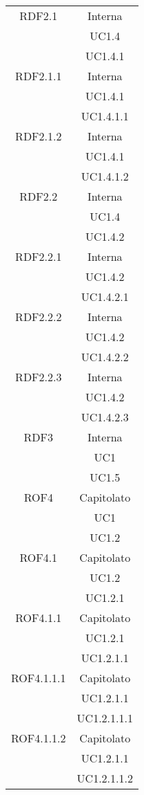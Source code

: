 \begin{longtable}{|c|c|}
\midrule
RDF2.1
& Interna\\
& UC1.4\\
& UC1.4.1\\

\midrule
RDF2.1.1
& Interna\\
& UC1.4.1\\
& UC1.4.1.1\\

\midrule
RDF2.1.2
& Interna\\
& UC1.4.1\\
& UC1.4.1.2\\

\midrule
RDF2.2
& Interna\\
& UC1.4\\
& UC1.4.2\\

\midrule
RDF2.2.1
& Interna\\
& UC1.4.2\\
& UC1.4.2.1\\

\midrule
RDF2.2.2
& Interna\\
& UC1.4.2\\
& UC1.4.2.2\\

\midrule
RDF2.2.3
& Interna\\
& UC1.4.2\\
& UC1.4.2.3\\

\midrule
RDF3
& Interna\\
& UC1\\
& UC1.5\\

\midrule
ROF4
& Capitolato\\
& UC1\\
& UC1.2\\

\midrule
ROF4.1
& Capitolato\\
& UC1.2\\
& UC1.2.1\\

\midrule
ROF4.1.1
& Capitolato\\
& UC1.2.1\\
& UC1.2.1.1\\

\midrule
ROF4.1.1.1
& Capitolato\\
& UC1.2.1.1\\
& UC1.2.1.1.1\\

\midrule
ROF4.1.1.2
& Capitolato\\
& UC1.2.1.1\\
& UC1.2.1.1.2\\


\end{longtable}
